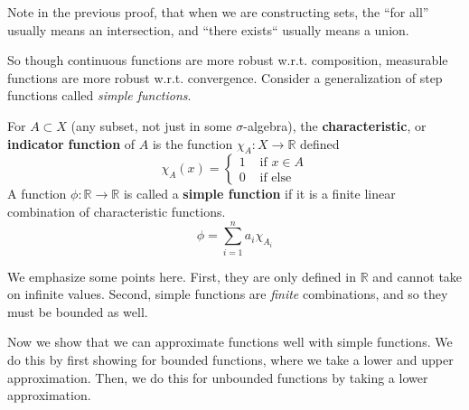   Note in the previous proof, that when we are constructing sets, the ``for all'' usually means an intersection, and ``there exists`` usually means a union. 

  So though continuous functions are more robust w.r.t. composition, measurable functions are more robust w.r.t. convergence. Consider a generalization of step functions called \textit{simple functions}. 

  \begin{definition}
    For $A \subset X$ (any subset, not just in some $\sigma$-algebra), the \textbf{characteristic}, or \textbf{indicator} \textbf{function} of $A$ is the function $\chi_A : X \longrightarrow \mathbb{R}$ defined 
    \begin{equation}
      \chi_A (x) = \begin{cases} 1 & \text{ if } x \in A \\ 0 & \text{ if else} \end{cases}
    \end{equation}
    A function $\phi: \mathbb{R} \longrightarrow \mathbb{R}$ is called a \textbf{simple function} if it is a finite linear combination of characteristic functions. 
    \begin{equation}
      \phi = \sum_{i=1}^n a_i \chi_{A_i}
    \end{equation}
  \end{definition} 

  We emphasize some points here. First, they are only defined in $\mathbb{R}$ and cannot take on infinite values. Second, simple functions are \textit{finite} combinations, and so they must be bounded as well. 

  Now we show that we can approximate functions well with simple functions. We do this by first showing for bounded functions, where we take a lower and upper approximation. Then, we do this for unbounded functions by taking a lower approximation. 

